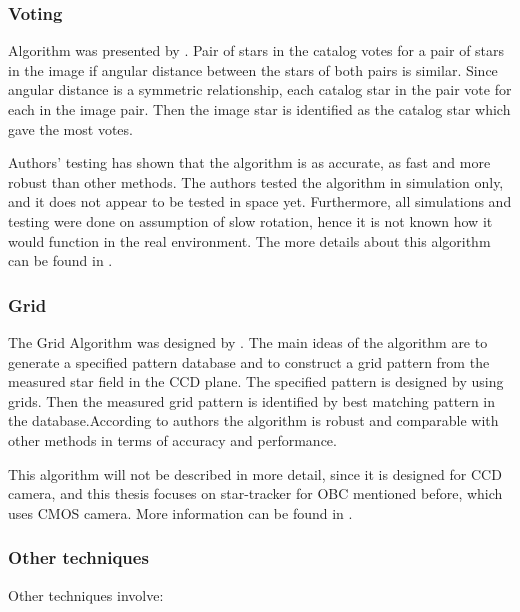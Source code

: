 \documentclass[12pt,a4paper,twoside]{article}
\begin{document}
\subsubsection{Voting}
Algorithm was presented by \citet{kolomenkin2008geometric}. Pair of stars in the catalog votes for a pair of stars in the image if angular distance between the stars of both pairs is similar. Since angular distance is a symmetric relationship, each catalog star in the pair vote for each in the image pair. Then the image star is identified as the catalog star which gave the most votes.

Authors' testing has shown that the algorithm is as accurate, as fast and more robust than other methods. The authors tested the algorithm in simulation only, and it does not appear to be tested in space yet. Furthermore, all simulations and testing were done on assumption of slow rotation, hence it is not known how it would function in the real environment. The more details about this algorithm can be found in \citet{kolomenkin2008geometric}.


\subsubsection{Grid}
The Grid Algorithm was designed by \citet{padgett1997grid}. The main ideas of the algorithm are to generate a specified pattern database and to construct a grid pattern from the measured star field in the CCD plane. The specified pattern is designed by using grids. Then the measured grid pattern is identified by best matching pattern in the database.According to authors the algorithm is robust and comparable with other methods in terms of accuracy and performance. 

This algorithm will not be described in more detail, since it is designed for CCD camera, and this thesis focuses on star-tracker for OBC mentioned before, which uses CMOS camera. More information can be found in \citet{padgett1997grid}.


\subsubsection{Other techniques}

Other techniques involve: 
\end{document}
